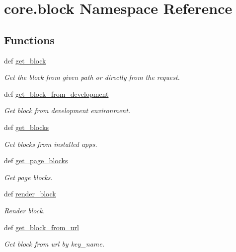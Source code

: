 \hypertarget{namespacecore_1_1block}{\section{core.\-block Namespace Reference}
\label{namespacecore_1_1block}
}
\subsection*{Functions}
\begin{DoxyCompactItemize}
\item 
def \hyperlink{namespacecore_1_1block_a2eee1c1fb948eeb739bce5d411a62a16}{get\-\_\-block}
\begin{DoxyCompactList}\small\item\em Get the block from given path or directly from the request. \end{DoxyCompactList}\item 
def \hyperlink{namespacecore_1_1block_ae441c05e2a28d533b65a61a6dc993e5c}{get\-\_\-block\-\_\-from\-\_\-development}
\begin{DoxyCompactList}\small\item\em Get block from development environment. \end{DoxyCompactList}\item 
def \hyperlink{namespacecore_1_1block_a24557895529b6c01cac47ae090c2b252}{get\-\_\-blocks}
\begin{DoxyCompactList}\small\item\em Get blocks from installed apps. \end{DoxyCompactList}\item 
def \hyperlink{namespacecore_1_1block_a7b4367b79966cfcd5fa225214cb3e7ed}{get\-\_\-page\-\_\-blocks}
\begin{DoxyCompactList}\small\item\em Get page blocks. \end{DoxyCompactList}\item 
def \hyperlink{namespacecore_1_1block_abdc40404a66abf3472930f40549e9928}{render\-\_\-block}
\begin{DoxyCompactList}\small\item\em Render block. \end{DoxyCompactList}\item 
def \hyperlink{namespacecore_1_1block_a4e59edab360c7de0aed37cec78c33847}{get\-\_\-block\-\_\-from\-\_\-url}
\begin{DoxyCompactList}\small\item\em Get block from url by key\-\_\-name. \end{DoxyCompactList}\item 

\end{DoxyCompactItemize}
